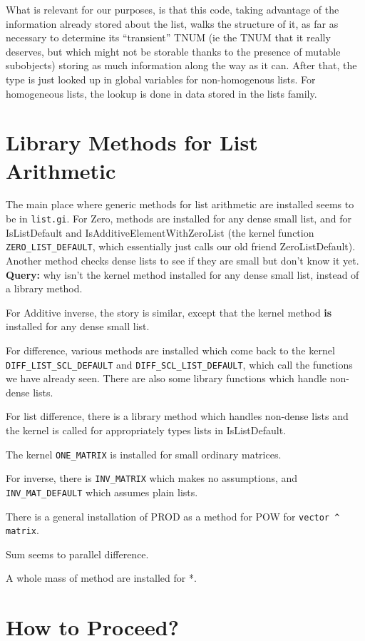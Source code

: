 \documentclass{article}
\begin{document}
What is relevant for our purposes, is that this code, taking advantage
of the information already stored about the list, walks the structure
of it, as far as necessary to determine its ``transient'' TNUM (ie
the TNUM that it really deserves, but which might not be storable
thanks to the presence of mutable subobjects) storing as much
information along the way as it can. After that, the type is just
looked up in global variables for non-homogenous lists. For
homogeneous lists, the lookup is done in data stored in the lists
family. 

\section{Library Methods for List Arithmetic}

The main place where generic methods for list arithmetic are installed
seems to be in \verb|list.gi|. For Zero, methods are installed for any
dense small list, and for IsListDefault and
IsAdditiveElementWithZeroList (the kernel function \verb|ZERO_LIST_DEFAULT|,
which essentially just calls our old friend ZeroListDefault). Another
method checks dense lists to see if they are small but don't know it
yet. \textbf{Query:} why isn't the kernel method installed for any
dense small list, instead of a library method.

For Additive inverse, the story is similar, except that the kernel
method \textbf{is} installed for any dense small list.


For difference, various methods are installed which come back to the
kernel \verb|DIFF_LIST_SCL_DEFAULT| and \verb|DIFF_SCL_LIST_DEFAULT|,
which call the functions we have already seen. There are also some
library functions which handle non-dense lists.

For list difference, there is a library method which handles non-dense
lists and the kernel is called for appropriately types lists in
IsListDefault.

The kernel \verb|ONE_MATRIX| is installed for small ordinary matrices.

For inverse, there is \verb|INV_MATRIX| which makes no assumptions,
and \verb|INV_MAT_DEFAULT| which assumes plain lists.

There is a general installation of PROD as a method for POW for 
\verb|vector ^ matrix|.

Sum seems to parallel difference. 

A whole mass of method are installed for *. 

\section{How to Proceed?}
\end{document}
